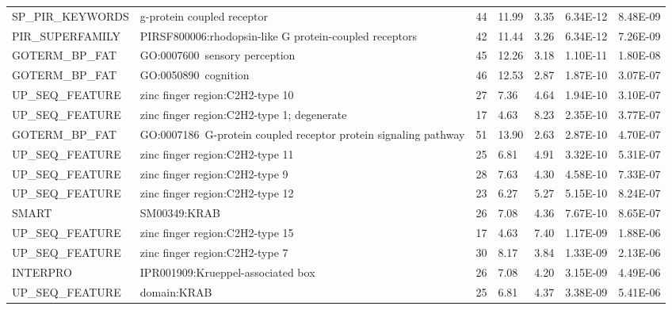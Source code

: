\documentclass[a4paper,11pt,oneside]{book}
\begin{document}
{\begin{longtable}{lllllll}
SP\_PIR\_KEYWORDS & g-protein coupled receptor                                      & 44    & 11.99 & 3.35            & 6.34E-12 & 8.48E-09 \\
PIR\_SUPERFAMILY  & PIRSF800006:rhodopsin-like G protein-coupled receptors          & 42    & 11.44 & 3.26            & 6.34E-12 & 7.26E-09 \\
GOTERM\_BP\_FAT   & GO:0007600~sensory perception                                   & 45    & 12.26 & 3.18            & 1.10E-11 & 1.80E-08 \\
GOTERM\_BP\_FAT   & GO:0050890~cognition                                            & 46    & 12.53 & 2.87            & 1.87E-10 & 3.07E-07 \\
UP\_SEQ\_FEATURE  & zinc finger region:C2H2-type 10                                 & 27    & 7.36  & 4.64            & 1.94E-10 & 3.10E-07 \\
UP\_SEQ\_FEATURE  & zinc finger region:C2H2-type 1; degenerate                      & 17    & 4.63  & 8.23            & 2.35E-10 & 3.77E-07 \\
GOTERM\_BP\_FAT   & GO:0007186~G-protein coupled receptor protein signaling pathway & 51    & 13.90 & 2.63            & 2.87E-10 & 4.70E-07 \\
UP\_SEQ\_FEATURE  & zinc finger region:C2H2-type 11                                 & 25    & 6.81  & 4.91            & 3.32E-10 & 5.31E-07 \\
UP\_SEQ\_FEATURE  & zinc finger region:C2H2-type 9                                  & 28    & 7.63  & 4.30            & 4.58E-10 & 7.33E-07 \\
UP\_SEQ\_FEATURE  & zinc finger region:C2H2-type 12                                 & 23    & 6.27  & 5.27            & 5.15E-10 & 8.24E-07 \\
SMART             & SM00349:KRAB                                                    & 26    & 7.08  & 4.36            & 7.67E-10 & 8.65E-07 \\
UP\_SEQ\_FEATURE  & zinc finger region:C2H2-type 15                                 & 17    & 4.63  & 7.40            & 1.17E-09 & 1.88E-06 \\
UP\_SEQ\_FEATURE  & zinc finger region:C2H2-type 7                                  & 30    & 8.17  & 3.84            & 1.33E-09 & 2.13E-06 \\
INTERPRO          & IPR001909:Krueppel-associated  box                              & 26    & 7.08  & 4.20            & 3.15E-09 & 4.49E-06 \\
UP\_SEQ\_FEATURE  & domain:KRAB                                                     & 25    & 6.81  & 4.37            & 3.38E-09 & 5.41E-06 \\

\end{longtable}}
\end{document}
